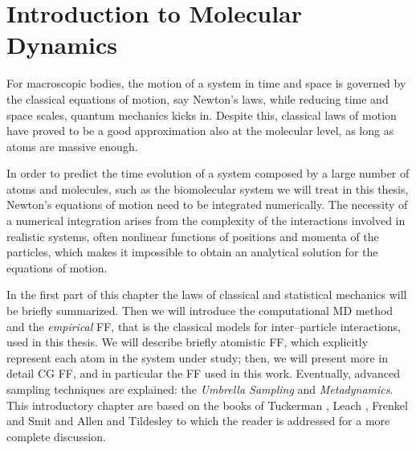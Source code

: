 \chapter{Introduction to Molecular Dynamics}
\label{chap:methods}
For macroscopic bodies, the motion of a system in time and space is governed by the classical equations of
motion, say Newton’s laws, while reducing time and space scales, quantum mechanics kicks in. Despite this, 
classical laws of motion have proved to be a good approximation also at the molecular level, as long
as atoms are massive enough.

In order to predict the time evolution of a system composed by a large number of atoms and molecules, such as the
biomolecular system we will treat in this thesis, Newton’s equations of motion need to be integrated numerically. 
The necessity of a numerical integration arises from the complexity of the interactions involved in realistic 
systems, often nonlinear functions of positions and momenta of the particles, which makes it impossible to obtain 
an analytical solution for the equations of motion.

In the first part of this chapter the laws of classical and statistical mechanics will be briefly summarized.
Then we will introduce the computational \acf{MD} method and the \textit{empirical} \acf{FF}, that is the 
classical models for inter--particle interactions, used in this thesis. We will describe briefly atomistic 
\ac{FF}, which explicitly represent each atom in the system under study; then, we will present more in detail 
\acf{CG} \ac{FF}, and in particular the \martini \ac{FF} used in this work. Eventually, advanced sampling 
techniques are explained: the \textit{Umbrella Sampling} and
\textit{Metadynamics}. This introductory chapter are based on the books of Tuckerman \cite{Tuckerman}, Leach
\cite{Leach}, Frenkel and Smit \cite{Frenkel} and Allen and Tildesley \cite{Allen} to which the reader is
addressed for a more complete discussion.

